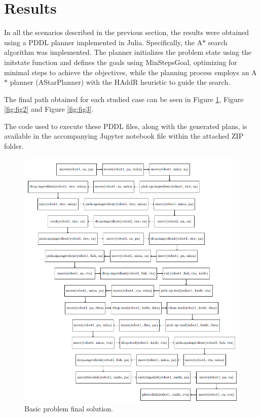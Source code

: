 \section{Results}
In all the scenarios described in the previous section, the results were obtained using a PDDL planner implemented in Julia. 
Specifically, the A$*$ search algorithm was implemented. The planner initializes the problem state using the initstate function and 
defines the goals using MinStepsGoal, optimizing for minimal steps to achieve the objectives, while the planning process employs an A$*$ 
planner (AStarPlanner) with the HAddR heuristic to guide the search.


The final path obtained for each studied case can be seen in Figure \ref{fig:fig1}, Figure \ref{fig:fig2} and Figure \ref{fig:fig3}.

The code used to execute these PDDL files, along with the generated plans, is available in the accompanying Jupyter notebook file within the attached ZIP folder.

\begin{figure}[t]
    \centering
    \includegraphics[width=1\linewidth]{fig1.png}
    \caption{Basic problem final solution.}
    \label{fig:fig1}
  \end{figure}

